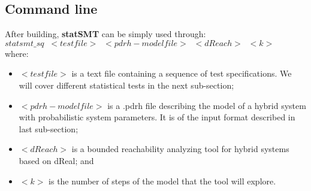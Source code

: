 \documentclass[runningheads,a4paper]{llncs}
\begin{document}


\subsection{Command line}
After building, {\bf statSMT} can be simply used through:\\

{\bf   
$statsmt\_sq\;\; <testfile> \;\;<pdrh-modelfile> \;\;<dReach>\;\;<k> $
}\\

where:
\begin{itemize}
\item $<testfile>$ is a text file containing a sequence of test specifications. We will cover different statistical tests in the next sub-section;
\item $<pdrh-modelfile>$ is a .pdrh file describing the model of a hybrid system with probabilistic system parameters. It is of the input format described in last sub-section;
\item $<dReach>$ is a bounded reachability analyzing tool for hybrid systems based on dReal; and
\item $<k>$ is the number of steps of the model that the tool will explore.\\
\end{itemize}
\end{document}
